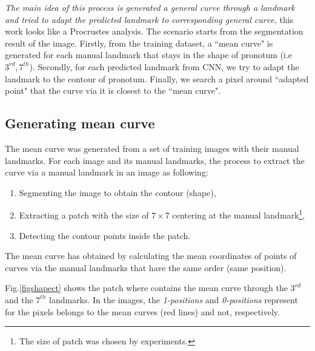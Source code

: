 \documentclass[10pt]{article}
\begin{document}
\textit{The main idea of this process is generated a general curve through a landmark and tried to adapt the predicted landmark to corresponding general curve,} this work looks like a Procrustes analysis. The scenario starts from the segmentation result of the image. Firstly, from the training dataset, a ``mean curve" is generated for each manual landmark that stays in the shape of pronotum (i.e $3^{rd}, 7^{th}$). Secondly, for each predicted landmark from CNN, we try to adapt the landmark to the contour of pronotum. Finally, we search a pixel around ``adapted point" that the curve via it is closest to the ``mean curve".

\subsection{Generating mean curve}
The mean curve was generated from a set of training images with their manual landmarks. For each image and its manual landmarks, the process to extract the curve via a manual landmark in an image as following:
\begin{enumerate}[nosep]
	\item Segmenting the image to obtain the contour (shape),
	\item Extracting a patch with the size of $7 \times 7$ centering at the manual landmark\footnote{The size of patch was chosen by experiments.},
	\item Detecting the contour points inside the patch.
\end{enumerate}
The mean curve has obtained by calculating the mean coordinates of points of curves via the manual landmarks that have the same order (same position).

Fig.\ref{figshapect} shows the patch where contains the mean curve through the $3^{rd}$ and the $7^{th}$ landmarks. In the images, the \textit{1-positions} and \textit{0-positions} represent for the pixels belongs to the mean curves (red lines) and not, respectively.
\end{document}
